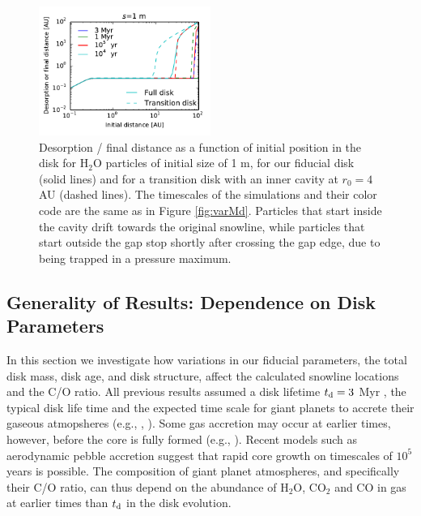 \documentclass[apj]{emulateapj}
\begin{document}
\begin{figure}[h!]
\centering
\includegraphics[width=0.5\textwidth]{desorption_distance_transition_disk_1000.pdf}
\caption{Desorption / final distance as a function of initial position in the disk for H$_2$O particles of initial size of 1 m, for our fiducial disk (solid lines) and for a transition disk with an inner cavity at $r_0=4$ AU (dashed lines). The timescales of the simulations and their color code are the same as in Figure \ref{fig:varMd}. Particles that start inside the cavity drift towards the original snowline, while particles that start outside the gap stop shortly after crossing the gap edge, due to being trapped in a pressure maximum.}
\label{fig:cavity}
\end{figure}


\subsection{Generality of Results: Dependence on Disk Parameters}
\label{sec:incond}

In this section we investigate how variations in our fiducial parameters, the total disk mass, disk age, and disk structure, %
affect the calculated snowline locations and the C/O ratio. %
All previous results assumed a disk lifetime $t_{\rm d}=3$ Myr%
, the typical disk life time and the expected time scale for giant planets to accrete their gaseous atmopsheres (e.g., \citealt{pollack96}, \citealt{piso14}). Some gas accretion may occur at earlier times, however,%
before the core is fully formed (e.g., \citealt{rafikov06}). Recent models such as aerodynamic pebble accretion \citep{lambrechts12} suggest that rapid core growth on timescales of $10^5$ years is possible. %
The composition of giant planet atmospheres, and specifically their C/O ratio, can thus depend on the abundance of H$_2$O, CO$_2$ and CO in gas at earlier times than $t_{\rm d}$ in the disk evolution. 
\end{document}
